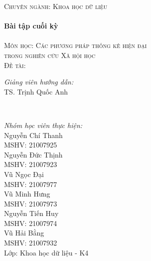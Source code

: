 \documentclass[14pt, a4paper]{article}
\theoremstyle{sltheorem}
\theoremstyle{soltheorem}
\begin{document}
\begin{titlepage}
    \textsc{\Large Chuyên ngành: Khoa học dữ liệu}\\[0.5cm] %



    \HRule \\[0.4cm]
    { \huge \bfseries Bài tập cuối kỳ}\\[0.4cm] %
    \HRule \\[1.5cm]

    \textsc{\Large Môn học: Các phương pháp thống kê hiện đại \\ trong nghiên cứu Xã hội học}\\[1cm] %


    \textsc{\Large Đề tài: }\\[1cm]


    \begin{minipage}{0.4\textwidth}
        \begin{flushleft} \large
            \emph{Giảng viên hướng dẫn:} \\
            TS. Trịnh Quốc Anh %
        \end{flushleft}
    \end{minipage}\\[0.5cm]

    \begin{minipage}{0.4\textwidth}
        \begin{flushleft} \small
            \emph{Nhóm học viên thực hiện:}\\
            Nguyễn Chí Thanh \\
            MSHV: 21007925 \\ %
            Nguyễn Đức Thịnh \\
            MSHV: 21007923 \\
            Vũ Ngọc Đại \\
            MSHV: 21007977 \\
            Vũ Minh Hưng \\
            MSHV: 21007973 \\
            Nguyễn Tiến Huy \\
            MSHV: 21007974\\
            Vũ Hải Bằng \\
            MSHV: 21007932\\
            Lớp: Khoa học dữ liệu - K4
        \end{flushleft}
    \end{minipage}



\end{titlepage}
\end{document}
